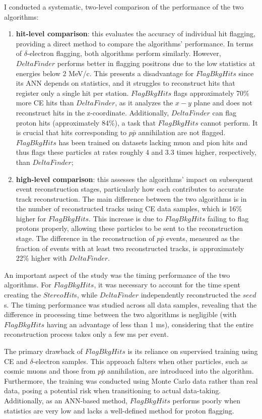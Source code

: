 I conducted a systematic, two-level comparison of the performance of the two algorithms:
\begin{enumerate}
    \item \textbf{hit-level comparison}: this evaluates the accuracy 
    of individual hit flagging, providing a direct method to compare 
    the algorithms' performance. In terms of $\delta$-electron flagging, 
    both algorithms perform similarly. However, $DeltaFinder$ performs 
    better in flagging positrons due to the low statistics at energies 
    below 2 MeV/c. This presents a disadvantage for $FlagBkgHits$ since 
    its ANN depends on statistics, and it struggles to reconstruct hits 
    that register only a single hit per station. $FlagBkgHits$ flags 
    approximately 70\% more CE hits than $DeltaFinder$, as it analyzes the $x-y$ 
    plane and does not reconstruct hits in the z-coordinate. Additionally, $DeltaFinder$ 
    can flag proton hits (approximately 84\%), a task that $FlagBkgHits$ cannot perform. 
    It is crucial that hits corresponding to $p\bar{p}$ annihilation 
    are not flagged. $FlagBkgHits$ has been trained on datasets lacking 
    muon and pion hits and thus flags these particles at rates roughly 
    4 and 3.3 times higher, respectively, than $DeltaFinder$;

\item  \textbf{high-level comparison}: this assesses the algorithms' impact on 
subsequent event reconstruction stages, particularly how each contributes to accurate 
track reconstruction. The main difference between the two algorithms is in the number 
of reconstructed tracks using CE data samples, which is 16\% higher for $FlagBkgHits$. 
This increase is due to $FlagBkgHits$ failing to flag protons properly, allowing these 
particles to be sent to the reconstruction stage. The difference in the reconstruction of $p\bar{p}$ 
events, measured as the fraction of events with at least two reconstructed tracks, is approximately 22\% higher with $DeltaFinder$.
\end{enumerate}

An important aspect of the study was the timing performance of the two algorithms. 
For $FlagBkgHits$, it was necessary to account for the time spent creating the $StereoHit$s, 
while $DeltaFinder$ independently reconstructed the $seed$s. The timing performance was 
studied across all data samples, revealing that the difference in processing time between 
the two algorithms is negligible (with $FlagBkgHits$ having an advantage of less than 1 ms), 
considering that the entire reconstruction process takes only a few ms per event.

The primary drawback of $FlagBkgHits$ is its reliance on supervised training using 
CE and $\delta$-electron samples. This approach falters when other particles, such 
as cosmic muons and those from $p\bar{p}$ annihilation, are introduced into the algorithm. 
Furthermore, the training was conducted using Monte Carlo data rather than real data, 
posing a potential risk when transitioning to actual data-taking. Additionally, as an 
ANN-based method, $FlagBkgHits$ performs poorly when statistics are very low and lacks 
a well-defined method for proton flagging.

